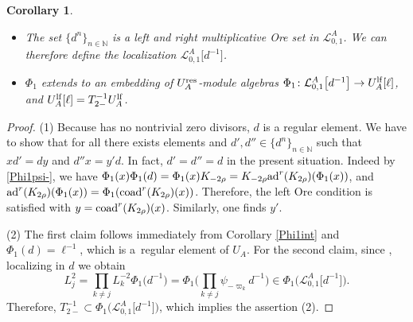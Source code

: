 \documentclass[pdftex]{sigma}
\numberwithin{equation}{section}
\newtheorem{cor}[teo]{Corollary}
\theoremstyle{definition}
\newcommand{\Ll}{{\mathcal L}}
\newcommand{\ra}{\rightarrow}
\begin{document}
\begin{cor}\label{Phi1int2}\quad
\begin{itemize}\itemsep=0pt
\item[$(1)$] The set $\{d^n\}_{n\in {\mathbb N}}$ is a left and right multiplicative Ore set in $\Ll_{0,1}^A$.
We can therefore define the localization $\Ll_{0,1}^A\big[d^{-1}\big]$.
\item[$(2)$] $\Phi_1$ extends to an embedding of $U_A^{\rm res}$-module algebras $\Phi_1\colon \Ll_{0,1}^A\big[d^{-1}\big] \ra U_A^{\rm lf}[\ell]$, and $U_A^{\rm lf}[\ell] = T_{2-}^{-1}U_A^{\rm lf}$.
\end{itemize}
\end{cor}
\begin{proof} (1) Because \smash{$\Ll_{0,1}^A$} has no nontrivial zero divisors, $d$ is a regular element. We have to show that for all \smash{$x\in \Ll_{0,1}^A$} there exists elements \smash{$y,y'\in\! \Ll_{0,1}^A$} and $d',d'' \in \!\{d^n\}_{n\in {\mathbb N}}$ such that~${xd'\!=\!dy}$ and $d''x=y'd$. In fact, $d'=d''=d$ in the present situation. Indeed by \eqref{Phi1psi-}, we have $\Phi_1(x)\Phi_1(d)=\Phi_1(x)K_{-2\rho}=K_{-2\rho}{\rm ad}^r(K_{2\rho})(\Phi_1(x))$, and ${\rm ad}^r(K_{2\rho})(\Phi_1(x))=\Phi_1({\rm coad}^r(K_{2\rho})(x))$. Therefore, the left Ore condition is satisfied with $y={\rm coad}^r(K_{2\rho})(x)$. Similarly, one finds $y'$.

(2) The first claim follows immediately from Corollary \ref{Phi1int} and $\Phi_1(d)=\ell^{-1}$, which is a~regular element of $U_A$. For the second claim, since , localizing in $d$ we obtain
\[
 L_j^2=\prod_{k\not=j} L_k^{-2 }\Phi_1\big(d^{-1}\big)=\Phi_1\biggl(\prod_{k\not=j} \psi_{-\varpi_k}d^{-1}\biggr) \in \Phi_1\big( \Ll_{0,1}^A\big[d^{-1}\big] \big).
\]
Therefore, $T_{2-}^{-1}\!\subset \Phi_1\bigl( \Ll_{0,1}^A\big[d^{-1}\big] \bigr)$, which implies the assertion (2).
\end{proof}
\end{document}
